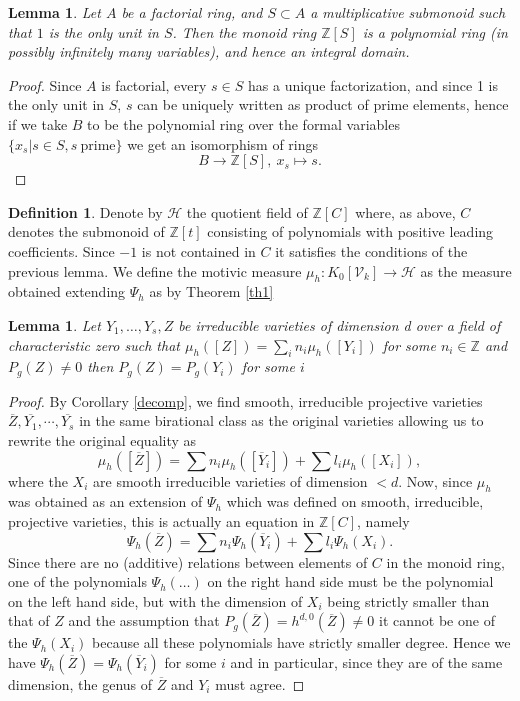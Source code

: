 \documentclass[11pt, a4paper, german, twoside]{article}
\theoremstyle{plain}
\newtheorem{lemma}[theorem]{Lemma}
\theoremstyle{definition}
\newtheorem{definition}[theorem]{Definition}
\newcommand{\gring}[1][k]{K_0[\mathcal{V}_#1]}
\begin{document}
\begin{lemma}
    Let $A$ be a factorial ring, and $S \subset A$ a multiplicative submonoid such that $1$ is the only unit in $S$. Then the monoid ring
    $\mathbb{Z}[S]$ is a polynomial ring (in possibly infinitely many variables), and hence an integral domain.
\end{lemma}
\begin{proof}
    Since $A$ is factorial, every $s \in S$ has a unique factorization, and since 1 is the only unit in $S$, 
    $s$ can be uniquely written as product of prime elements, hence if we take $B$ to be the polynomial ring over the formal
    variables $\{x_s | s \in S, s\ \text{prime}\}$ we get an isomorphism of rings
    \[
        B \to \mathbb{Z}[S], \ x_s \mapsto s.
    \]
\end{proof}

\begin{definition}
    Denote by $\mathcal{H}$ the quotient field of $\mathbb{Z}[C]$ where, as above, $C$ denotes the submonoid of $\mathbb{Z}[t]$ 
    consisting of polynomials with positive leading coefficients. Since $-1$ is not contained in $C$ it satisfies the conditions of the
    previous lemma.
    We define the motivic measure $\mu_h \colon \gring \to \mathcal{H}$ as the measure obtained extending $\Psi_h$ as by Theorem \ref{th1}
\end{definition}

\begin{lemma}
    \label{same}
    Let $Y_1,\dots,Y_s,Z$ be irreducible varieties of dimension d over a field of characteristic zero 
    such that $\mu_h([Z]) = \sum_i n_i \mu_h([Y_i])$ for some $n_i \in \mathbb{Z}$ and $P_g(Z) \neq 0$ then $P_g(Z) = P_g(Y_i)$ for some $i$
\end{lemma}
\begin{proof}
    By Corollary \ref{decomp}, we find smooth, irreducible projective varieties $\overline{Z},\overline{Y_1},\cdots, \overline{Y_s}$ in the same
    birational class as the original varieties allowing us to rewrite the original equality as 
    \[
        \mu_h([\overline{Z}]) = \sum n_i\mu_h([\overline{Y}_i]) + \sum l_i \mu_h([X_i]),
    \]
    where the $X_i$ are smooth irreducible varieties of dimension $<d$.
    Now, since $\mu_h$ was obtained as an extension of $\Psi_h$ which was defined on smooth, irreducible, projective varieties, this is
    actually an equation in $\mathbb{Z}[C]$, namely
    \[
        \Psi_h(\overline{Z}) = \sum n_i \Psi_h(\overline{Y}_i) + \sum l_i\Psi_h(X_i).
    \]
    Since there are no (additive) relations between elements of $C$ in the monoid ring, one of the polynomials $\Psi_h(\dots)$ on the 
    right hand side must be the polynomial on the left hand side, but with the dimension of 
    $X_i$ being strictly smaller than that of $Z$ and the assumption that
    $P_g(\overline{Z}) = h^{d,0}(\overline{Z}) \neq 0$ it cannot be one of the $\Psi_h(X_i)$ because all these polynomials have strictly smaller
    degree. Hence we have $\Psi_h(\overline{Z}) = \Psi_h(\overline{Y}_i)$ for some $i$ and in particular, since they are of the same dimension, 
    the genus of $\overline{Z}$ and $Y_i$ must agree.
\end{proof}
\end{document}
